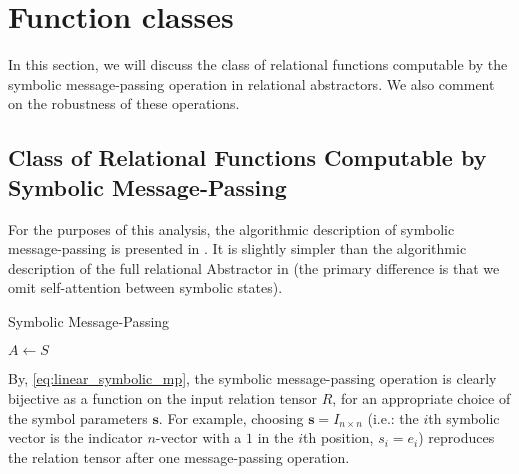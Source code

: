 \def\rdot{\bigcdot}
\def\F{{\mathfrak{F}}}

\section{Function classes}
\label{sec:function_spaces}

In this section, we will discuss the class of relational functions computable by the symbolic message-passing operation in relational abstractors. We also comment on the robustness of these operations.

\subsection{Class of Relational Functions Computable by Symbolic Message-Passing}
\label{ssec:function_class_symbolic_mp}
For the purposes of this analysis, the algorithmic description of symbolic message-passing is presented in . It is slightly simpler than the algorithmic description of the full relational Abstractor in  (the primary difference is that we omit self-attention between symbolic states).

\begin{algorithm}[h!]
	\caption{Symbolic Message-Passing}\label{alg:symbolic_mp}
	
	\vspace{1em}
	
	$A \gets S$
	
\end{algorithm}



By, \cref{eq:linear_symbolic_mp}, the symbolic message-passing operation is clearly bijective as a function on the input relation tensor $R$, for an appropriate choice of the symbol parameters $\boldsymbol{s}$. For example, choosing $\boldsymbol{s} = I_{n \times n}$ (i.e.: the $i$th symbolic vector is the indicator $n$-vector with a $1$ in the $i$th position, $s_i = e_i$) reproduces the relation tensor after one message-passing operation. 

